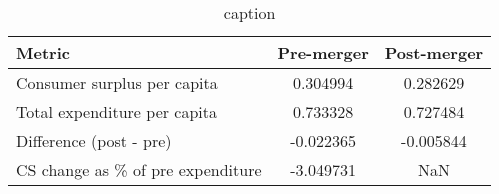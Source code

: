 \begin{table}[H]
\centering
\caption{{{caption}}}
\begin{tabular}{lcc}
\toprule
Metric & Pre-merger & Post-merger \\
\midrule
Consumer surplus per capita & 0.304994 & 0.282629 \\
Total expenditure per capita & 0.733328 & 0.727484 \\
Difference (post - pre) & -0.022365 & -0.005844 \\
CS change as \% of pre expenditure & -3.049731 & NaN \\
\bottomrule
\end{tabular}
\label{tab:q17_sum_c1t1}
\end{table}
